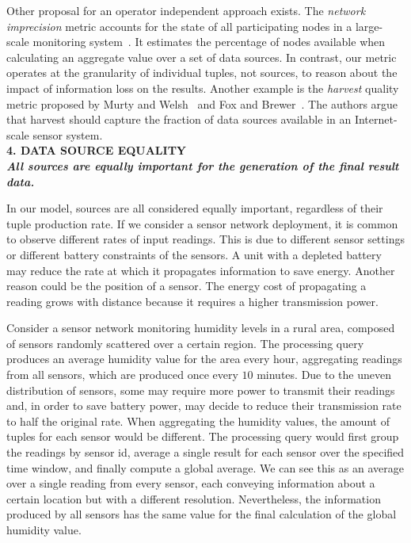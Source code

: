 Other proposal for an operator independent approach exists. The \textit{network imprecision}  metric
accounts for the state of all participating nodes in a large-scale monitoring
system~\cite{network-imprecision}.
It estimates the percentage of nodes available when calculating an aggregate value over a set of data
sources. In contrast, our metric operates at the granularity of individual tuples, not sources, to reason
about the impact of information loss on the results.
Another example is the \textit{harvest} quality metric proposed by Murty and
Welsh~\cite{dependable-is-sensing} and Fox and Brewer~\cite{Fox1999}. The authors argue that harvest
should capture the fraction of data sources available in an Internet-scale sensor system. \\
 
\textbf{4. DATA SOURCE EQUALITY \\ \textit{All sources are equally important for the generation of the
final result data.}}
	  
In our model, sources are all considered equally important, regardless of their tuple production rate.
If we consider a sensor network deployment, it is common to observe different rates of input readings.
This is due to different sensor settings or different battery constraints of the sensors. A unit with a
depleted battery may reduce the rate at which it propagates information to save energy.
Another reason could be the position of a sensor. The energy cost of propagating a reading grows with
distance because it requires a higher transmission power.
	
	Consider a sensor network monitoring humidity levels in a rural area, composed of sensors randomly
	scattered over a certain region. The processing query produces an average humidity value for the area
	every hour, aggregating readings from all sensors, which are produced once every $10$
	minutes. Due to the uneven distribution of sensors, some may require more power to transmit their
	readings and, in order to save battery power, may decide to reduce their transmission rate to half the original rate. 
	When aggregating the humidity values, the amount of tuples for each sensor would be different. The
	processing query would first group the readings by sensor id, average a single result for each sensor
	over the specified time window, and finally compute a global average. We can see this as an average
	over a single reading from every sensor, each conveying information about a certain location but with
	a different resolution. Nevertheless, the information produced by all sensors has the same value for the
	final calculation of the global humidity value.
	
